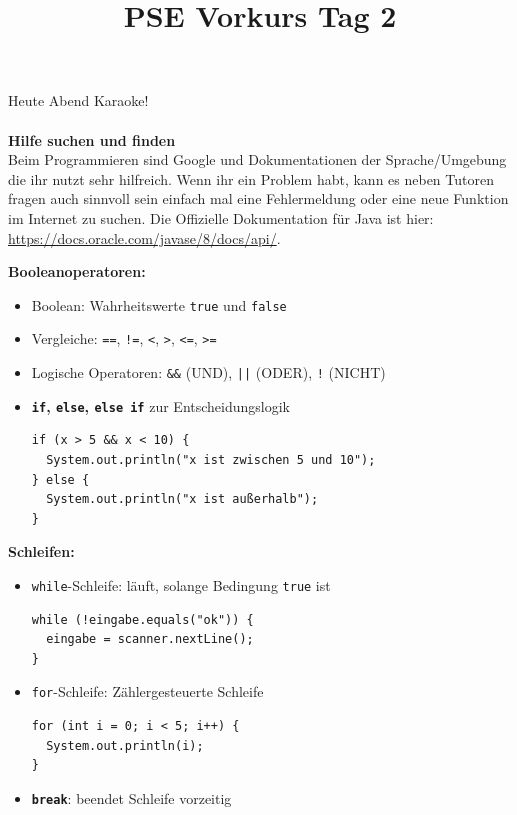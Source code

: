 \documentclass{../../sheet}
\title{PSE Vorkurs Tag 2}
\begin{document}
\maketitle
Heute Abend Karaoke!\\\\
\textbf{Hilfe suchen und finden}\\
Beim Programmieren sind Google und Dokumentationen der Sprache/Umgebung die ihr nutzt sehr hilfreich. Wenn ihr ein Problem habt, kann es neben Tutoren fragen auch sinnvoll sein einfach mal eine Fehlermeldung oder eine neue Funktion im Internet zu suchen. Die Offizielle Dokumentation für Java ist hier: \url{https://docs.oracle.com/javase/8/docs/api/}.

\textbf{Booleanoperatoren:}
\begin{itemize}
		\item Boolean: Wahrheitswerte \texttt{true} und \texttt{false}
		\item Vergleiche: \texttt{==}, \texttt{!=}, \texttt{<}, \texttt{>}, \texttt{<=}, \texttt{>=}
		\item Logische Operatoren: \texttt{\&\&} (UND), \texttt{||} (ODER), \texttt{!} (NICHT)
		\item \textbf{\texttt{if}, \texttt{else}, \texttt{else if}} zur Entscheidungslogik
		      \begin{verbatim}
if (x > 5 && x < 10) {
  System.out.println("x ist zwischen 5 und 10");
} else {
  System.out.println("x ist außerhalb");
}
          \end{verbatim}
	\end{itemize}
    \bigskip
\textbf{Schleifen:}
\begin{itemize}
		\item \texttt{while}-Schleife: läuft, solange Bedingung \texttt{true} ist
		      \begin{verbatim}
while (!eingabe.equals("ok")) {
  eingabe = scanner.nextLine();
}
          \end{verbatim}
		\item \texttt{for}-Schleife: Zählergesteuerte Schleife
		      \begin{verbatim}
for (int i = 0; i < 5; i++) {
  System.out.println(i);
}
          \end{verbatim}
		\item \textbf{\texttt{break}}: beendet Schleife vorzeitig

	\end{itemize}
\end{document}
